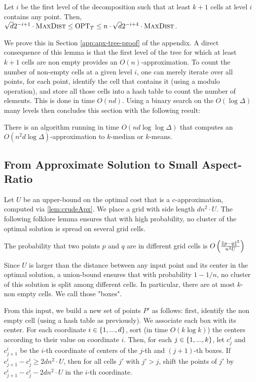 \begin{lemma}\label{lem:apxTree}
Let $i$ be the first level of the decomposition such that at least $k+1$ cells at level $i$ contains any point. Then, $\sqrt{d}2^{-i+1} \cdot \textsc{MaxDist} \leq
\text{OPT}_T \leq n \cdot \sqrt{d}2^{-i+4} \cdot \textsc{MaxDist}$.
\end{lemma}

We prove this in Section \ref{app:apx-tree-proof} of the appendix. A direct consequence of this lemma is that the first level of the tree for which at least
$k+1$ cells are non empty provides an $O(n)$-approximation. To count the number of non-empty cells at a given level $i$, one can merely iterate over all
points, for each point, identify the cell that contains it (using a modulo operation), and store all those cells into a hash table to count the number of elements.
This is done in time $O(nd)$.  Using a binary search on the $O(\log \Delta)$ many levels then concludes this section with the following result:

\begin{lemma}\label{lem:crudeApx}
There is an algorithm running in time $O(nd \log \log \Delta)$ that computes an  $O(n^2 d \log \Delta)$-approximation to $k$-median or $k$-means.
\end{lemma}

\subsection{From Approximate Solution to Small Aspect-Ratio}
Let $U$ be an upper-bound on the optimal cost that is a $c$-approximation, computed via \cref{lem:crudeApx}. We place a grid with side length $d n^2\cdot U$.
The following folklore lemma ensures that with high probability, no cluster of the optimal solution is spread on several grid cells.

\begin{lemma}
The probability that two points $p$ and $q$ are in different grid cells is $O\left( \frac{\|p-q\|^2}{n^2 U}\right)$
\end{lemma}

Since $U$ is larger than the distance between any input point and its center in the optimal solution, a union-bound ensures that with probability $1-1/n$, no
cluster of this solution is split among different cells.  In particular, there are at most $k$-non empty cells. We call those "boxes".

From this input, we build a new set of points $P'$ as follows: first, identify the non empty cell (using a hash table as previously). We associate each box with
its center.  For each coordinate $i \in \left\{ 1, ..., d \right\}$, sort (in time $O(k \log k)$) the centers according to their value on coordinate $i$. Then, for
each $j \in \left\{ 1, ..., k\right\}$, let $c^i_j$ and $c^i_{j+1}$ be the $i$-th coordinate of centers of the $j$-th and $(j+1)$-th boxes. If $c^i_{j+1} - c^i_j
\geq 2d n^2\cdot U$, then for all cells $j'$ with $j' > j$, shift the points of $j'$ by $c^i_{j+1} - c^i_j - 2d n^2\cdot U$ in the $i$-th coordinate.

